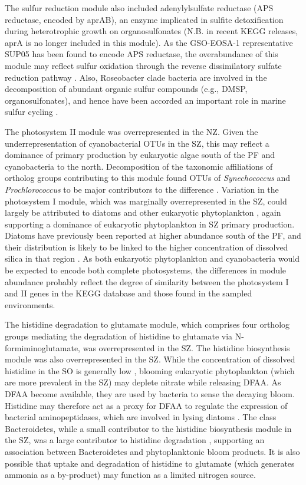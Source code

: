 The sulfur reduction module also included adenylylsulfate reductase (APS reductase, encoded by aprAB), an enzyme implicated in sulfite detoxification during heterotrophic growth on organosulfonates \cite{Meyer:2007jd} (N.B. in recent \ac{KEGG} releases, aprA is no longer included in this module).
As the GSO-EOSA-1 representative SUP05 has been found to encode APS reductase, the overabundance of this module may reflect sulfur oxidation through the reverse dissimilatory sulfate reduction pathway \cite{Walsh:2009fja}.
Also, Roseobacter clade bacteria are involved in the decomposition of abundant organic sulfur compounds (e.g., \ac{DMSP}, organosulfonates), and hence have been accorded an important role in marine sulfur cycling \cite{Moran:2007fs}.

The photosystem II module was overrepresented in the \ac{NZ}.
Given the underrepresentation of cyanobacterial \acp{OTU} in the \ac{SZ}, this may reflect a dominance of primary production by eukaryotic algae south of the \ac{PF} and cyanobacteria to the north.
Decomposition of the taxonomic affiliations of ortholog groups contributing to this module found \acp{OTU} of \emph{Synechococcus} and \emph{Prochlorococcus} to be major contributors to the difference .
Variation in the photosystem I module, which was marginally overrepresented in the \ac{SZ}, could largely be attributed to diatoms and other eukaryotic phytoplankton , again supporting a dominance of eukaryotic phytoplankton in \ac{SZ} primary production.
Diatoms have previously been reported at higher abundance south of the \ac{PF}, and their distribution is likely to be linked to the higher concentration of dissolved silica in that region \cite{Trull:2001tg}.
As both eukaryotic phytoplankton and cyanobacteria would be expected to encode both complete photosystems, the differences in module abundance probably reflect the degree of similarity between the photosystem I and II genes in the \ac{KEGG} database and those found in the sampled environments. 

The histidine degradation to glutamate module, which comprises four ortholog groups mediating the degradation of histidine to glutamate via N-formiminoglutamate, was overrepresented in the \ac{SZ}.
The histidine biosynthesis module was also overrepresented in the \ac{SZ}.
While the concentration of dissolved histidine in the \ac{SO} is generally low \cite{Kawahata:2000ur}, blooming eukaryotic phytoplankton (which are more prevalent in the \ac{SZ}) may deplete nitrate while releasing \ac{DFAA}.
As \ac{DFAA} become available, they are used by bacteria to sense the decaying bloom. 
Histidine may therefore act as a proxy for \ac{DFAA} to regulate the expression of bacterial aminopeptidases, which are involved in lysing diatoms \cite{Bidle:2001vi}.
The class Bacteroidetes, while a small contributor to the histidine biosynthesis module in the \ac{SZ}, was a large contributor to histidine degradation , supporting an association between Bacteroidetes and phytoplanktonic bloom products. 
It is also possible that uptake and degradation of histidine to glutamate (which generates ammonia as a by-product) may function as a limited nitrogen source.

